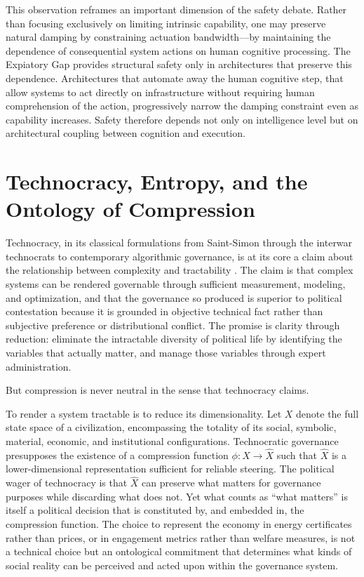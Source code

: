 \documentclass[12pt]{article}
\begin{document}
This observation reframes an important dimension of the safety debate. Rather than focusing exclusively on limiting intrinsic capability, one may preserve natural damping by constraining actuation bandwidth---by maintaining the dependence of consequential system actions on human cognitive processing. The Expiatory Gap provides structural safety only in architectures that preserve this dependence. Architectures that automate away the human cognitive step, that allow systems to act directly on infrastructure without requiring human comprehension of the action, progressively narrow the damping constraint even as capability increases. Safety therefore depends not only on intelligence level but on architectural coupling between cognition and execution.

\section{Technocracy, Entropy, and the Ontology of Compression}

Technocracy, in its classical formulations from Saint-Simon through the interwar technocrats to contemporary algorithmic governance, is at its core a claim about the relationship between complexity and tractability \citep{SaintSimon1964, GordonTechnocracy2025}. The claim is that complex systems can be rendered governable through sufficient measurement, modeling, and optimization, and that the governance so produced is superior to political contestation because it is grounded in objective technical fact rather than subjective preference or distributional conflict. The promise is clarity through reduction: eliminate the intractable diversity of political life by identifying the variables that actually matter, and manage those variables through expert administration.

But compression is never neutral in the sense that technocracy claims.

To render a system tractable is to reduce its dimensionality. Let $X$ denote the full state space of a civilization, encompassing the totality of its social, symbolic, material, economic, and institutional configurations. Technocratic governance presupposes the existence of a compression function $\phi: X \rightarrow \hat{X}$ such that $\hat{X}$ is a lower-dimensional representation sufficient for reliable steering. The political wager of technocracy is that $\hat{X}$ can preserve what matters for governance purposes while discarding what does not. Yet what counts as ``what matters'' is itself a political decision that is constituted by, and embedded in, the compression function. The choice to represent the economy in energy certificates rather than prices, or in engagement metrics rather than welfare measures, is not a technical choice but an ontological commitment that determines what kinds of social reality can be perceived and acted upon within the governance system.
\end{document}
